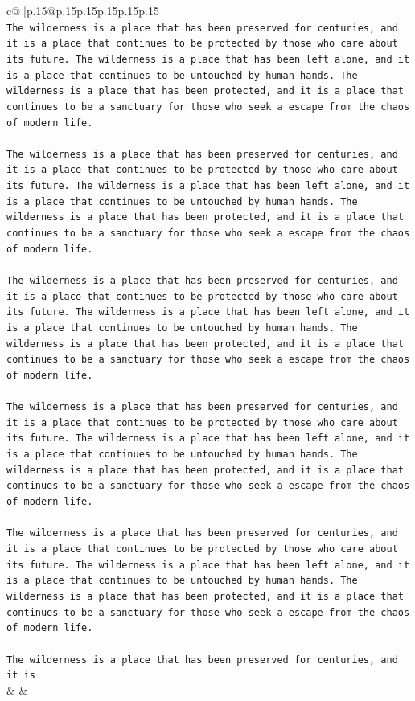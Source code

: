 \documentclass{article}
\begin{document}
{\begin{supertabular}{c@{$\;$}|p{.15\linewidth}@{}p{.15\linewidth}p{.15\linewidth}p{.15\linewidth}p{.15\linewidth}p{.15\linewidth}}
{{{\\ 
\texttt{The wilderness is a place that has been preserved for centuries, and it is a place that continues to be protected by those who care about its future. The wilderness is a place that has been left alone, and it is a place that continues to be untouched by human hands. The wilderness is a place that has been protected, and it is a place that continues to be a sanctuary for those who seek a escape from the chaos of modern life.} \\
\\ 
\texttt{The wilderness is a place that has been preserved for centuries, and it is a place that continues to be protected by those who care about its future. The wilderness is a place that has been left alone, and it is a place that continues to be untouched by human hands. The wilderness is a place that has been protected, and it is a place that continues to be a sanctuary for those who seek a escape from the chaos of modern life.} \\
\\ 
\texttt{The wilderness is a place that has been preserved for centuries, and it is a place that continues to be protected by those who care about its future. The wilderness is a place that has been left alone, and it is a place that continues to be untouched by human hands. The wilderness is a place that has been protected, and it is a place that continues to be a sanctuary for those who seek a escape from the chaos of modern life.} \\
\\ 
\texttt{The wilderness is a place that has been preserved for centuries, and it is a place that continues to be protected by those who care about its future. The wilderness is a place that has been left alone, and it is a place that continues to be untouched by human hands. The wilderness is a place that has been protected, and it is a place that continues to be a sanctuary for those who seek a escape from the chaos of modern life.} \\
\\ 
\texttt{The wilderness is a place that has been preserved for centuries, and it is a place that continues to be protected by those who care about its future. The wilderness is a place that has been left alone, and it is a place that continues to be untouched by human hands. The wilderness is a place that has been protected, and it is a place that continues to be a sanctuary for those who seek a escape from the chaos of modern life.} \\
\\ 
\texttt{The wilderness is a place that has been preserved for centuries, and it is} \\
            }
        }
    }
    & & \\ \\


\end{supertabular}}
\end{document}
